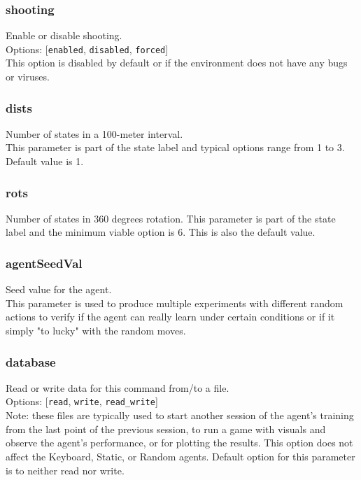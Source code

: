 \subsubsection*{shooting}
\label{opt:shooting}
Enable or disable shooting.\\
Options: [\texttt{enabled}, \texttt{disabled}, \texttt{forced}]\\
This option is disabled by default or if the environment does not have any bugs or viruses.

\subsubsection*{dists}
\label{opt:dists}
Number of states in a 100-meter interval.\\
This parameter is part of the state label and typical options range from 1 to 3. Default value is 1.

\subsubsection*{rots}
\label{opt:rots}
Number of states in 360 degrees rotation.
This parameter is part of the state label and the minimum viable option is 6. This is also the default value.

\subsubsection*{agentSeedVal}
\label{opt:agentSeedVal}
Seed value for the agent.\\
This parameter is used to produce multiple experiments with different random actions to verify if the agent can really learn under certain conditions or if it simply "to lucky" with the random moves.

\subsubsection*{database}
\label{opt:database}
Read or write data for this command from/to a file.\\
Options: [\texttt{read}, \texttt{write}, \texttt{read\_write}]\\
Note: these files are typically used to start another session of the agent's training from the last point of the previous session, to run a game with visuals and observe the agent's performance, or for plotting the results. This option does not affect the Keyboard, Static, or Random agents. Default option for this parameter is to neither read nor write.

